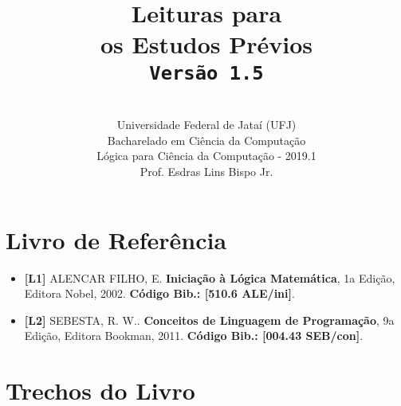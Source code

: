 \documentclass[12pt,a4paper,oneside]{article}
\author{\\Universidade Federal de Jataí (UFJ)\\Bacharelado em Ciência da Computação \\Lógica para Ciência da Computação - 2019.1 \\Prof. Esdras Lins Bispo Jr.}
\date{}
\title{
	\sc \huge Leituras para \\os Estudos Prévios
	\\{\tt Versão 1.5}
}
\begin{document}
\maketitle

\section{Livro de Referência}
	\begin{itemize}
		\item[] {\bf \color{blue} [L1]} ALENCAR FILHO, E. {\bf Iniciação à Lógica Matemática}, 1a Edição, Editora Nobel, 2002. {\color{blue} \bf Código Bib.: [510.6 ALE/ini]}.
		\item[] {\bf \color{purple} [L2]} SEBESTA, R. W.. {\bf Conceitos de Linguagem de Programação}, 9a Edição, Editora Bookman, 2011. { \color{purple} \bf Código Bib.: [004.43 SEB/con]}.
	\end{itemize}
	
\section{Trechos do Livro}
\end{document}
